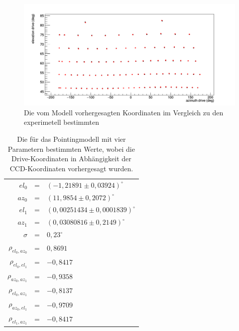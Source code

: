 \begin{figure}[htbp]
\centering
\includegraphics[width=\textwidth]{../341/C2D4comp2.png}
\caption{Die vom Modell vorhergesagten Koordinaten im Vergleich zu den experimetell bestimmten}
\label{img:C2D4comp2}
\end{figure}
\begin{table}[htbp]
\centering
\begin{tabular}{rcl}
\toprule
$el_0$ &=& $(-1,21891\pm 0,03924)^{\circ}$\\
$az_0$ &=& $(11,9854\pm0,2072)^{\circ}$\\
$el_1$ &=& $(0,00251434\pm 0,0001839)^{\circ}$\\
$az_1$ &=& $(0,03080816\pm0,2149)^{\circ}$\\
$\sigma$ &=& $0,23^{\circ}$\\
$\rho_{el_0,az_0}$ &=& $0,8691$\\
$\rho_{el_0,el_1}$ &=& $-0,8417$\\
$\rho_{az_0,az_1}$ &=& $-0,9358$\\
$\rho_{el_0,az_1}$ &=& $-0,8137$\\
$\rho_{az_0,el_1}$ &=& $-0,9709$\\
$\rho_{el_1,az_1}$ &=& $-0,8417$\\
\bottomrule
\end{tabular}
\label{tab:C2D4}
\caption{Die für das Pointingmodell mit vier Parametern bestimmten Werte, wobei die Drive-Koordinaten in Abhängigkeit der CCD-Koordinaten vorhergesagt wurden.}
\end{table}

